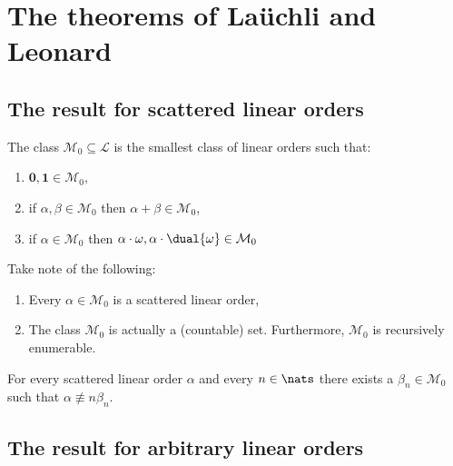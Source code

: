 \chapter{The theorems of La\"uchli and Leonard}


\section{The result for scattered linear orders}


    \begin{dfn}
        The class $\mathcal{M}_0\subseteq\mathcal{L}$ is the smallest class of linear orders such that:
        \begin{enumerate}
            \item $\mathbf{0},\mathbf{1}\in\mathcal{M}_0$,
            \item if $\alpha,\beta\in\mathcal{M}_0$ then $\alpha+\beta\in\mathcal{M}_0$,
            \item if $\alpha\in\mathcal{M}_0$ then $\alpha\cdot\omega,\alpha\cdot\dual{\omega}\in\mathcal{M}_0$
        \end{enumerate}
    \end{dfn}

    \begin{rem}
        Take note of the following:
        \begin{enumerate}
            \item Every $\alpha\in\mathcal{M}_0$ is a scattered linear order,
            \item The class $\mathcal{M}_0$ is actually a (countable) set.  Furthermore, $\mathcal{M}_0$ is recursively enumerable.
        \end{enumerate}
    \end{rem}

    \begin{thm}
        For every scattered linear order $\alpha$ and every $n\in\nats$ there exists a $\beta_n\in\mathcal{M}_0$ such that $\alpha\nequiv{n}\beta_n$.
    \end{thm}


\section{The result for arbitrary linear orders}
